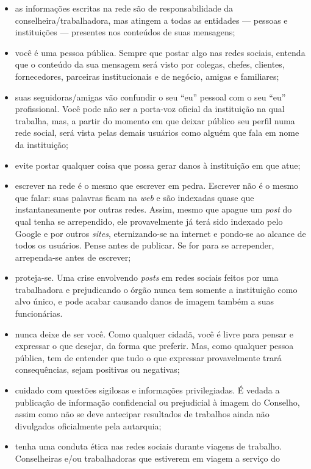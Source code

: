 \begin{itemize}
\item
as informações escritas na rede são de responsabilidade da
conselheira/trabalhadora, mas atingem a todas as entidades --- pessoas
e instituições --- presentes nos conteúdos de suas mensagens;
\item
você é uma pessoa pública. Sempre que postar algo nas redes sociais,
entenda que o conteúdo da sua mensagem será visto por colegas, chefes,
clientes, fornecedores, parceiras institucionais e de negócio, amigas
e familiares;
\item
suas seguidoras/amigas vão confundir o seu ``eu'' pessoal com o seu
``eu'' profissional. Você pode não ser a porta-voz oficial da
instituição na qual trabalha, mas, a partir do momento em que deixar
público seu perfil numa rede social, será vista pelas demais usuários
como alguém que fala em nome da instituição;
\item
evite postar qualquer coisa que possa gerar danos à instituição em que
atue;
\item
escrever na rede é o mesmo que escrever em pedra. Escrever não é o
mesmo que falar: suas palavras ficam na \emph{web} e são indexadas
quase que instantaneamente por outras redes. Assim, mesmo que apague
um \emph{post} do qual tenha se arrependido, ele provavelmente já terá
sido indexado pelo Google e por outros \emph{sites}, eternizando-se na
internet e pondo-se ao alcance de todos os usuários. Pense antes de
publicar. Se for para se arrepender, arrependa-se antes de escrever;
\item
proteja-se. Uma crise envolvendo \emph{posts} em redes sociais feitos
por uma trabalhadora e prejudicando o órgão nunca tem somente a
instituição como alvo único, e pode acabar causando danos de imagem
também a suas funcionárias.
\item
nunca deixe de ser você. Como qualquer cidadã, você é livre para
pensar e expressar o que desejar, da forma que preferir. Mas, como
qualquer pessoa pública, tem de entender que tudo o que expressar
provavelmente trará consequências, sejam positivas ou negativas;
\item
cuidado com questões sigilosas e informações privilegiadas. É vedada a
publicação de informação confidencial ou prejudicial à imagem do
Conselho, assim como não se deve antecipar resultados de trabalhos
ainda não divulgados oficialmente pela autarquia;
\item
tenha uma conduta ética nas redes sociais durante viagens de trabalho.
Conselheiras e/ou trabalhadoras que estiverem em viagem a serviço do

\end{itemize}
